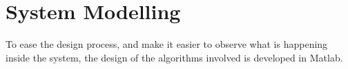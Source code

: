 \section{System Modelling}

To ease the design process, and make it easier to observe what is happening inside the system, the design of the algorithms involved is developed in Matlab.
